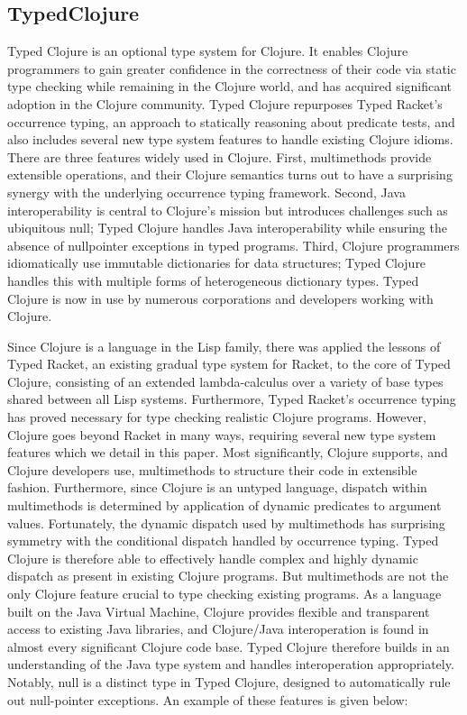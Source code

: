 \subsection{TypedClojure}

Typed Clojure is an optional type system for Clojure. It enables Clojure
programmers to gain greater confidence in the correctness of their code via
static type checking while remaining in the Clojure world, and has acquired
significant adoption in the Clojure community. Typed Clojure repurposes Typed
Racket’s occurrence typing, an approach to statically reasoning about predicate
tests, and also includes several new type system features to handle existing
Clojure idioms. There are three features widely used in Clojure. First,
multimethods provide extensible operations, and their Clojure semantics turns
out to have a surprising synergy with the underlying occurrence typing
framework. Second, Java interoperability is central to Clojure’s mission but
introduces challenges such as ubiquitous null; Typed Clojure handles Java
interoperability while ensuring the absence of nullpointer exceptions in typed
programs. Third, Clojure programmers idiomatically use immutable dictionaries
for data structures; Typed Clojure handles this with multiple forms of
heterogeneous dictionary types. Typed Clojure is now in use by numerous
corporations and developers working with Clojure.

Since Clojure is a language in the Lisp family, there was applied the lessons of
Typed Racket, an existing gradual type system for Racket, to the core of Typed
Clojure, consisting of an extended lambda-calculus over a variety of base types
shared between all Lisp systems. Furthermore, Typed Racket’s occurrence typing
has proved necessary for type checking realistic Clojure programs. However,
Clojure goes beyond Racket in many ways, requiring several new type system
features which we detail in this paper. Most significantly, Clojure supports,
and Clojure developers use, multimethods to structure their code in extensible
fashion. Furthermore, since Clojure is an untyped language, dispatch within
multimethods is determined by application of dynamic predicates to argument
values. Fortunately, the dynamic dispatch used by multimethods has surprising
symmetry with the conditional dispatch handled by occurrence typing. Typed
Clojure is therefore able to effectively handle complex and highly dynamic
dispatch as present in existing Clojure programs. But multimethods are not the
only Clojure feature crucial to type checking existing programs. As a language
built on the Java Virtual Machine, Clojure provides flexible and transparent
access to existing Java libraries, and Clojure/Java interoperation is found in
almost every significant Clojure code base. Typed Clojure therefore builds in an
understanding of the Java type system and handles interoperation appropriately.
Notably, null is a distinct type in Typed Clojure, designed to automatically
rule out null-pointer exceptions. An example of these features is given below:


